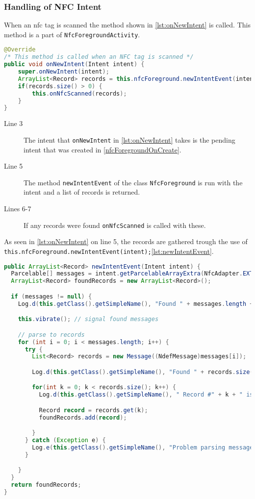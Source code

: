 \subsubsection{Handling of NFC Intent}
When an \ac{nfc} tag is scanned the method shown in \autoref{lst:onNewIntent} is called. This method is a part of \lstinline|NfcForegroundActivity|.
\begin{lstlisting}[language=java, label=lst:onNewIntent, caption=onNewIntent]
@Override
/* This method is called when an NFC tag is scanned */
public void onNewIntent(Intent intent) { 
    super.onNewIntent(intent);
    ArrayList<Record> records = this.nfcForeground.newIntentEvent(intent);
    if(records.size() > 0) {
        this.onNfcScanned(records);
    }
}  
\end{lstlisting}
\begin{description}
\item[Line 3] The intent that \lstinline|onNewIntent| in \autoref{lst:onNewIntent} takes is the pending intent that was created in \autoref{nfcForegroundOnCreate}.
\item[Line 5] The method \lstinline|newIntentEvent| of the class \lstinline|NfcForeground| is run with the intent and a list of records is returned.
\item[Lines 6-7] If any records were found \lstinline|onNfcScanned| is called with these.
\end{description}
As seen in \autoref{lst:onNewIntent} on line 5, the records are gathered trough the use of \lstinline|this.nfcForeground.newIntentEvent(intent);|\autoref{lst:newIntentEvent}.

\begin{lstlisting}[language=java, label=lst:newIntentEvent, caption=newIntentEvent]
public ArrayList<Record> newIntentEvent(Intent intent) {
  Parcelable[] messages = intent.getParcelableArrayExtra(NfcAdapter.EXTRA_NDEF_MESSAGES);
  ArrayList<Record> foundRecords = new ArrayList<Record>();

  if (messages != null) {
    Log.d(this.getClass().getSimpleName(), "Found " + messages.length + " NDEF messages");

    this.vibrate(); // signal found messages

    // parse to records
    for (int i = 0; i < messages.length; i++) {
      try {
        List<Record> records = new Message((NdefMessage)messages[i]);

        Log.d(this.getClass().getSimpleName(), "Found " + records.size() + " records in message " + i);

        for(int k = 0; k < records.size(); k++) {
          Log.d(this.getClass().getSimpleName(), " Record #" + k + " is of class " + records.get(k).getClass().getSimpleName());

          Record record = records.get(k);
          foundRecords.add(record);

        }
      } catch (Exception e) {
        Log.e(this.getClass().getSimpleName(), "Problem parsing message", e);
      }

    }
  }
  return foundRecords;
}
\end{lstlisting}





